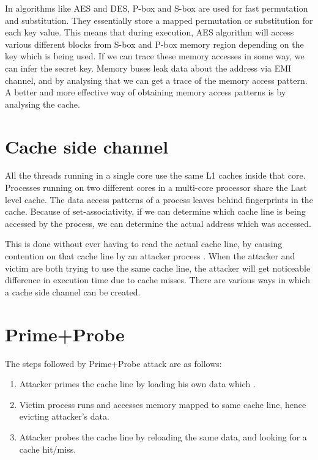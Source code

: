 In algorithms like AES and DES, P-box and S-box are used for fast permutation
and substitution. They essentially store a mapped permutation or substitution
for each key value. This means that during execution, AES algorithm will
access various different blocks from S-box and P-box memory region depending
on the key which is being used. If we can trace these memory accesses in some
way, we can infer the secret key. Memory buses leak data about the address via
EMI channel, and by analysing that we can get a trace of the memory access
pattern. A better and more effective way of obtaining memory access patterns
is by analysing the cache.

\section{Cache side channel}

All the threads running in a single core use the same L1 caches inside that
core. Processes running on two different cores in a multi-core processor share
the Last level cache. The data access patterns of a process leaves behind
fingerprints in the cache. Because of set-associativity, if we can determine
which cache line is being accessed by the process, we can determine the actual
address which was accessed.

This is done without ever having to read the actual cache line, by causing
contention on that cache line by an attacker process
. When the attacker and victim are both trying to
use the same cache line, the attacker will get noticeable difference in
execution time due to cache misses. There are various ways in which a cache
side channel can be created.

\section{Prime+Probe}

The steps followed by Prime+Probe attack are as follows:

\begin{enumerate}
\item Attacker primes the cache line by loading his own data which .
\item Victim process runs and accesses memory mapped to same cache line, hence
    evicting attacker's data.
\item Attacker probes the cache line by reloading the same data, and looking
    for a cache hit/miss.
\end{enumerate}

